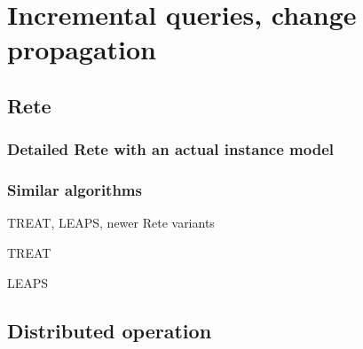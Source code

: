 \section{Incremental queries, change propagation}
\label{sec:incrementality}



\subsection{Rete}




\subsubsection{Detailed Rete with an actual instance model}





\subsubsection{Similar algorithms}

TREAT, LEAPS, newer Rete variants

TREAT \cite{Miranker:1991:OPT:627280.627434} 

LEAPS \cite{Batory:1994:LA:899216}



\subsection{Distributed operation}








